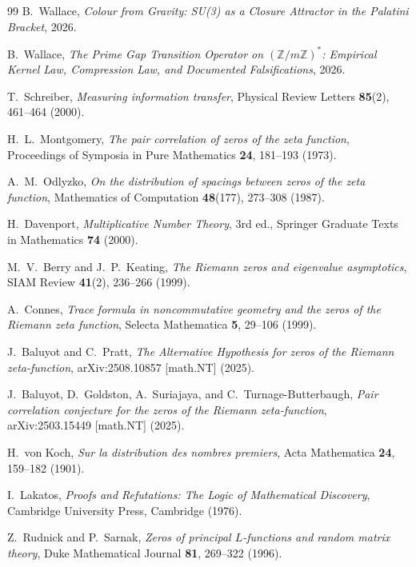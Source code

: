 \documentclass[11pt,a4paper]{article}
\theoremstyle{plain}
\theoremstyle{definition}
\theoremstyle{remark}
\begin{document}
\begin{thebibliography}{99}
B.~Wallace,
\textit{Colour from Gravity: SU(3) as a Closure Attractor in the Palatini Bracket},
2026.

B.~Wallace,
\textit{The Prime Gap Transition Operator on $(\mathbb{Z}/m\mathbb{Z})^*$: Empirical Kernel Law, Compression Law, and Documented Falsifications},
2026.

T.~Schreiber,
\textit{Measuring information transfer},
Physical Review Letters \textbf{85}(2), 461--464 (2000).

H.~L.~Montgomery,
\textit{The pair correlation of zeros of the zeta function},
Proceedings of Symposia in Pure Mathematics \textbf{24}, 181--193 (1973).

A.~M.~Odlyzko,
\textit{On the distribution of spacings between zeros of the zeta function},
Mathematics of Computation \textbf{48}(177), 273--308 (1987).

H.~Davenport,
\textit{Multiplicative Number Theory}, 3rd ed.,
Springer Graduate Texts in Mathematics \textbf{74} (2000).

M.~V.~Berry and J.~P.~Keating,
\textit{The Riemann zeros and eigenvalue asymptotics},
SIAM Review \textbf{41}(2), 236--266 (1999).

A.~Connes,
\textit{Trace formula in noncommutative geometry and the zeros of the Riemann zeta function},
Selecta Mathematica \textbf{5}, 29--106 (1999).

J.~Baluyot and C.~Pratt,
\textit{The Alternative Hypothesis for zeros of the Riemann zeta-function},
arXiv:2508.10857 [math.NT] (2025).

J.~Baluyot, D.~Goldston, A.~Suriajaya, and C.~Turnage-Butterbaugh,
\textit{Pair correlation conjecture for the zeros of the Riemann zeta-function},
arXiv:2503.15449 [math.NT] (2025).

H.~von Koch,
\textit{Sur la distribution des nombres premiers},
Acta Mathematica \textbf{24}, 159--182 (1901).

I.~Lakatos,
\textit{Proofs and Refutations: The Logic of Mathematical Discovery},
Cambridge University Press, Cambridge (1976).

Z.~Rudnick and P.~Sarnak,
\textit{Zeros of principal $L$-functions and random matrix theory},
Duke Mathematical Journal \textbf{81}, 269--322 (1996).


\end{thebibliography}
\end{document}
